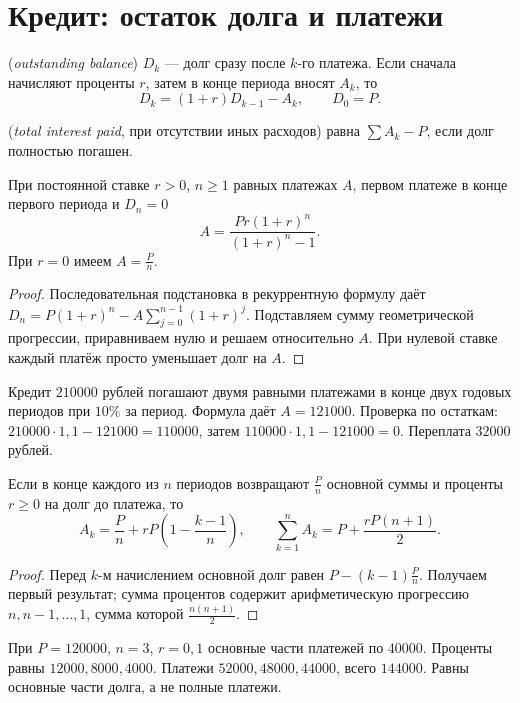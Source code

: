 \section{Кредит: остаток долга и платежи}
\begin{definition} (\emph{outstanding balance}) \(D_k\) --- долг сразу после \(k\)-го платежа. Если сначала начисляют проценты \(r\), затем в конце периода вносят \(A_k\), то
\[
D_k=(1+r)D_{k-1}-A_k,\qquad D_0=P.
\]
\par{} (\emph{total interest paid}, при отсутствии иных расходов) равна \(\sum A_k-P\), если долг полностью погашен.\end{definition}
\begin{theorem}
При постоянной ставке \(r>0\), \(n\ge1\) равных платежах \(A\), первом платеже в конце первого периода и \(D_n=0\)
\[
A=\frac{Pr(1+r)^n}{(1+r)^n-1}.
\]
При \(r=0\) имеем \(A=\frac{P}{n}\).
\end{theorem}
\begin{proof}Последовательная подстановка в рекуррентную формулу даёт \(D_n=P(1+r)^n-A\sum_{j=0}^{n-1}(1+r)^j\). Подставляем сумму геометрической прогрессии, приравниваем нулю и решаем относительно \(A\). При нулевой ставке каждый платёж просто уменьшает долг на \(A\).\end{proof}
\begin{example}Кредит \(210000\) рублей погашают двумя равными платежами в конце двух годовых периодов при \(10\%\) за период. Формула даёт \(A=121000\). Проверка по остаткам: \(210000\cdot1{,}1-121000=110000\), затем \(110000\cdot1{,}1-121000=0\). Переплата \(32000\) рублей.\end{example}
\begin{theorem}
Если в конце каждого из \(n\) периодов возвращают \(\frac{P}{n}\) основной суммы и проценты \(r\ge0\) на долг до платежа, то
\[
A_k=\frac Pn+rP\left(1-\frac{k-1}n\right),\qquad
\sum_{k=1}^n A_k=P+\frac{rP(n+1)}2.
\]
\end{theorem}
\begin{proof}Перед \(k\)-м начислением основной долг равен \(P-(k-1)\frac{P}{n}\). Получаем первый результат; сумма процентов содержит арифметическую прогрессию \(n,n-1,\ldots,1\), сумма которой \(\frac{n(n+1)}2\).\end{proof}
\begin{example}При \(P=120000\), \(n=3\), \(r=0{,}1\) основные части платежей по \(40000\). Проценты равны \(12000,8000,4000\). Платежи \(52000,48000,44000\), всего \(144000\). Равны основные части долга, а не полные платежи.\end{example}

